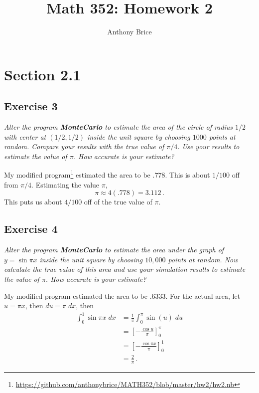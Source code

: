 \documentclass{tufte-handout}
\title{Math 352: Homework 2}
\author{Anthony Brice}
\begin{document}
\maketitle
\section{Section 2.1}
\subsection{Exercise 3}
\begin{description}
\item \textit{Alter the program \textbf{MonteCarlo} to estimate the
    area of the circle of radius $1/2$ with center at $(1/2,1/2)$
    inside the unit square by choosing $1000$ points at random. Compare
    your results with the true value of $\pi/4$. Use your results to
    estimate the value of $\pi$. How accurate is your estimate?}
\end{description}

My modified
program\footnote{\url{https://github.com/anthonybrice/MATH352/blob/master/hw2/hw2.nb}}
estimated the area to be $.778$. This is about $1/100$ off from
$\pi/4$. Estimating the value $\pi$, \[\pi \approx 4(.778) = 3.112
\,.\]
This puts us about $4/100$ off of the true value of $\pi$.

\subsection{Exercise 4}
\begin{description}
\item \textit{Alter the program \textbf{MonteCarlo} to estimate the
    area under the graph of $y = \sin{\pi x}$ inside the unit square by
    choosing $10,000$ points at random. Now calculate the true value
    of this area and use your simulation results to estimate the value
    of $\pi$. How accurate is your estimate?}
\end{description}

My modified program estimated the area to be $.6333$. For the actual area,
let $u = \pi x$, then $du = \pi \; dx$, then
\begin{align*}
  \int_0^1 \sin \pi x \; dx & = \frac{1}{\pi} \int_0^\pi
  \sin(u) \; du \\
  &= \left[ - \frac{\cos u}{\pi} \right]_0^\pi \\
  &= \left[ - \frac{\cos \pi x}{\pi} \right]_0^1 \\
  &= \frac{2}{\pi} \, .
\end{align*}
\end{document}
